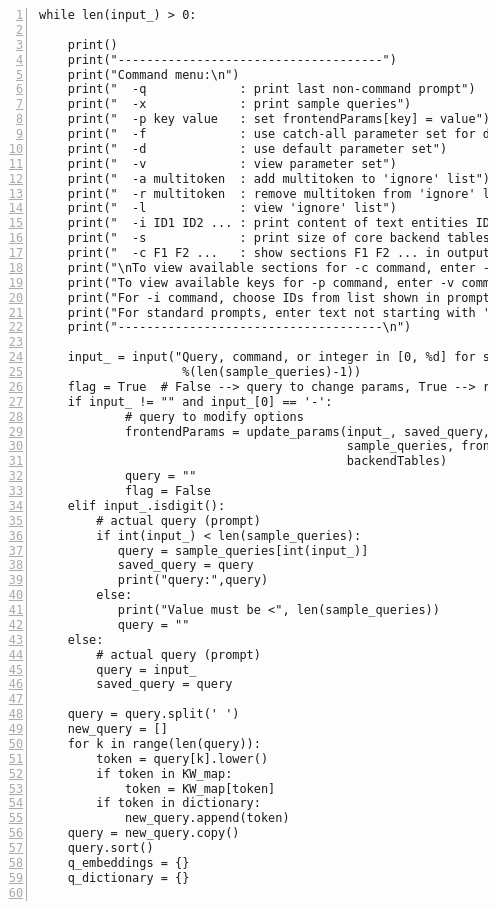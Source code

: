 \documentclass[10pt]{article}
\begin{document}
{\begin{lstlisting}[numbers=left,basicstyle=\ttfamily\footnotesize]
while len(input_) > 0:  

    print()
    print("-------------------------------------")
    print("Command menu:\n")
    print("  -q             : print last non-command prompt")
    print("  -x             : print sample queries")
    print("  -p key value   : set frontendParams[key] = value")
    print("  -f             : use catch-all parameter set for debugging")
    print("  -d             : use default parameter set")
    print("  -v             : view parameter set")
    print("  -a multitoken  : add multitoken to 'ignore' list")
    print("  -r multitoken  : remove multitoken from 'ignore' list")
    print("  -l             : view 'ignore' list")
    print("  -i ID1 ID2 ... : print content of text entities ID1 ID2 ...")
    print("  -s             : print size of core backend tables")
    print("  -c F1 F2 ...   : show sections F1 F2 ... in output results")
    print("\nTo view available sections for -c command, enter -v command.")
    print("To view available keys for -p command, enter -v command.")
    print("For -i command, choose IDs from list shown in prompt results.")
    print("For standard prompts, enter text not starting with '-' or digit.")
    print("-------------------------------------\n")

    input_ = input("Query, command, or integer in [0, %d] for sample query: " 
                    %(len(sample_queries)-1))
    flag = True  # False --> query to change params, True --> real query
    if input_ != "" and input_[0] == '-':
            # query to modify options
            frontendParams = update_params(input_, saved_query, 
                                           sample_queries, frontendParams, 
                                           backendTables)
            query = ""
            flag = False
    elif input_.isdigit(): 
        # actual query (prompt)
        if int(input_) < len(sample_queries):
           query = sample_queries[int(input_)]
           saved_query = query
           print("query:",query) 
        else:
           print("Value must be <", len(sample_queries))
           query = ""
    else:
        # actual query (prompt)
        query = input_
        saved_query = query

    query = query.split(' ')
    new_query = []
    for k in range(len(query)):
        token = query[k].lower()
        if token in KW_map: 
            token = KW_map[token]
        if token in dictionary:
            new_query.append(token)
    query = new_query.copy()
    query.sort() 
    q_embeddings = {} 
    q_dictionary = {} 


\end{lstlisting}}
\end{document}
